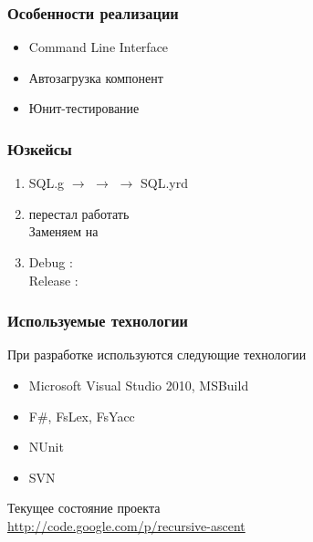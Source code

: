 \documentclass{beamer}
\begin{document}
\begin{frame}
	\transwipe[direction=90]
	\frametitle{Особенности реализации}
	\begin{itemize}
		\item Command Line Interface
		\item Автозагрузка компонент
		\item Юнит-тестирование
	\end{itemize}
\end{frame}

\begin{frame}
	\transwipe[direction=90]
	\frametitle{Юзкейсы}
	\begin{enumerate}
		\item SQL.g \ensuremath{\rightarrow}  \ensuremath{\rightarrow}  \ensuremath{\rightarrow} SQL.yrd
		\item {} перестал работать \\ Заменяем на  
		\item Debug :  \\Release : 
	\end{enumerate}
\end{frame}

\begin{frame}
	\transwipe[direction=90]
	\frametitle{Используемые технологии}
 При разработке используются следующие технологии
	\begin{itemize}
		\item Microsoft Visual Studio 2010, MSBuild
		\item F\#, FsLex, FsYacc
		\item NUnit
		\item SVN
	\end{itemize}	
Текущее состояние проекта\\
\href{http://code.google.com/p/recursive-ascent/}{http://code.google.com/p/recursive-ascent}
\end{frame}
\end{document}
